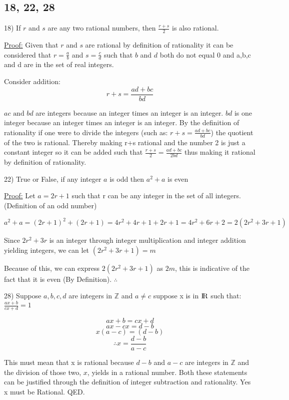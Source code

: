 \documentclass[11pt]{article}
\newcommand*{\mybox}[1]{\framebox{#1}}
\begin{document}
\subsection{18, 22, 28}
\begin{flushleft}

18)  If $r$ and $s$ are any two rational numbers, then $\displaystyle{\frac{r+s}{2}}$ is also rational.

\underline{Proof:} Given that $r$ and $s$ are rational by definition of rationality it can be considered that $r  = \displaystyle{\frac{a}{b}}$ and  $s  = \displaystyle{\frac{c}{d}}$ such that $b$ and $d$ both do not equal 0 and a,b,c and d are in the set of real integers.

Consider addition: 
$$r+s=\displaystyle{\frac{ad+bc}{bd}}$$

$ac \text{ and } bd$ are integers because an integer times an integer is an integer. $bd$ is one integer because an integer times an integer is an integer. By the definition of rationality if one were to divide the integers (such as: $r+s=\displaystyle{\frac{ad+bc}{bd}}$) the quotient of the two is rational. Thereby making r+s rational and the number 2 is just a constant integer so it can be added such that $\displaystyle{\frac{r+s}{2}}=\displaystyle{\frac{ad+bc}{2bd}}$ thus making it rational by definition of rationality.  \mybox{Q.E.D}

\hrulefill

22) True or False, if any integer $a$ is odd then $a^2+a$ is even 

\underline{Proof:} Let $a=2r+1$ such that r can be any integer in the set of all integers. (Definition of an odd number)

$a^2+a = (2r+1)^2 + (2r+1) = 4r^2+4r+1+2r+1=4r^2+6r+2=2(2r^2+3r+1)$

Since $2r^2+3r$ is an integer through integer multiplication and integer addition yielding integers, we can let $(2r^2+3r+1) = m$

Because of this, we can express $2(2r^2+3r+1)$ as $2m$, this is indicative of the fact that it is even (By Definition). $\therefore$ \mybox{TRUE, Q.E.D.} 

\hrulefill

28) Suppose $a,b,c,d$ are integers in $\mathbb{Z}$  and $a\neq c$ suppose x is in ${\rm I\!R}$ such that: $\displaystyle{\frac{ax+b}{cx+d}} = 1$ 

$$ax+b = cx+d$$
$$ax-cx = d-b$$
$$x(a-c) = (d-b)$$
$$\therefore x = \displaystyle{\frac{d-b}{a-c}}$$

This must mean that x is rational because $d-b$ and $a-c$ are integers in $\mathbb{Z}$ and the division of those two, $x$, yields in a rational number. Both these statements can be justified through the definition of integer subtraction and rationality. Yes x must be Rational. QED.




\hrulefill
\end{flushleft}
\end{document}
